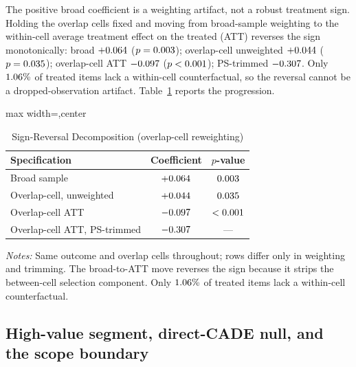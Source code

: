 \label{app:overlap_scope_submission}%
The positive broad coefficient is a weighting artifact, not a robust
treatment sign. Holding the overlap cells fixed and moving from
broad-sample weighting to the within-cell average treatment effect on the
treated (ATT) reverses the sign monotonically: broad $+0.064$
($p=0.003$); overlap-cell unweighted $+0.044$
($p=0.035$); overlap-cell ATT $-0.097$
($p<0.001$); PS-trimmed $-0.307$. Only
$1.06\%$ of treated items lack a within-cell
counterfactual, so the reversal cannot be a dropped-observation artifact.
Table~\ref{tab:app_overlap_decomp_submission} reports the progression.

\begin{table}[htbp]
\centering
\caption{Sign-Reversal Decomposition (overlap-cell reweighting)}
\label{tab:app_overlap_decomp_submission}
\scriptsize
\begin{adjustbox}{max width=\textwidth,center}
\begin{threeparttable}
\begin{tabular}{lcc}
\toprule
Specification & Coefficient & $p$-value \\
\midrule
Broad sample & $+0.064$ & $0.003$ \\
Overlap-cell, unweighted & $+0.044$ & $0.035$ \\
Overlap-cell ATT & $-0.097$ & $<0.001$ \\
Overlap-cell ATT, PS-trimmed & $-0.307$ & --- \\
\bottomrule
\end{tabular}
\begin{tablenotes}
\scriptsize
\item \textit{Notes:} Same outcome and overlap cells throughout; rows
differ only in weighting and trimming. The broad-to-ATT move reverses
the sign because it strips the between-cell selection component. Only
$1.06\%$ of treated items lack a within-cell
counterfactual.
\end{tablenotes}
\end{threeparttable}
\end{adjustbox}
\end{table}

\subsection{High-value segment, direct-CADE null, and the scope boundary}
\label{app:scope_segment_submission}

